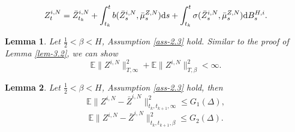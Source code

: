 \documentclass[10pt,a4paper]{amsart}
\newtheorem{lemma}{Lemma}
\def\E{\mathbb E}
\def\d{\text{\rm{d}}}
\begin{document}
\begin{equation}\label{eq-5.3}
	Z_{t}^{i,N}=\bar Z_{t_k}^{i,N}+\int_{t_k}^{t}b(\bar Z_{s}^{i,N},\bar \mu_{s}^{Z,N})\d s+\int_{t_k}^{t}\sigma(\bar Z_{s}^{i,N},\bar \mu_{s}^{Z,N})\d B^{H,i}_{s}.
\end{equation}

\begin{lemma}\label{lem-4.1}
	Let $\frac{1}{2}<\beta<H$, Assumption \ref{ass-2.3} hold. Similar to the proof of Lemma \ref{lem-3.2}, we can show
	\begin{equation}
		\E\|Z^{i,N}\|^2_{T,\infty}+\E\|Z^{i,N}\|^2_{T,\beta}< \infty.
	\end{equation}
\end{lemma}

\begin{lemma}\label{lem-4.2}
	Let $\frac{1}{2}<\beta<H$, Assumption \ref{ass-2.3} hold, then
	\begin{equation}
		\E\|Z^{i,N}-\bar{Z}^{i,N}\|^2_{t_k,t_{k+1},\infty}\leq G_1(\Delta),
	\end{equation}
	\begin{equation}
		\E\|Z^{i,N}-\bar{Z}^{i,N}\|^2_{t_k,t_{k+1},\beta}\leq G_2(\Delta).
	\end{equation}
\end{lemma}
\end{document}
